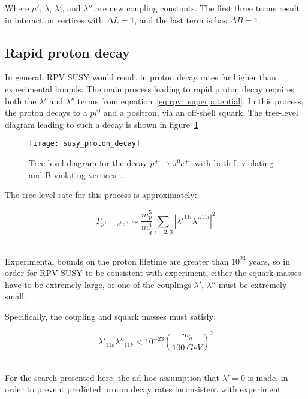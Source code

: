 Where $\mu'$, $\lambda$, $\lambda'$, and $\lambda''$ are new coupling constants.
The first three terms result in interaction vertices with $\Delta L = 1$,
and the last term is has $\Delta B = 1$.

\subsection{Rapid proton decay}\label{subsec:proton_decay}

In general, RPV SUSY would result in proton decay rates far higher than experimental bounds.
The main process leading to rapid proton decay requires both the $\lambda'$ and $\lambda''$ terms from equation~\ref{eq:rpv_superpotential}.
In this process, the proton decays to a $pi^0$ and a positron, via an off-shell squark.
The tree-level diagram leading to such a decay is shown in figure~\ref{fig:susy_proton_decay}

\begin{figure}[!ht]
    \centering
\texttt{[image: susy\_proton\_decay]}
\caption{Tree-level diagram for the decay $p^+ \rightarrow \pi^0 e^+$, with both L-violating and B-violating vertices~\cite{susy-primer-1998}.}
\label{fig:susy_proton_decay}
\end{figure}

The tree-level rate for this process is approximately:

\begin{equation}\label{eq:proton_decay_rate}
    \Gamma_{p^+ \rightarrow \pi^0 e^+} \sim \frac{m_p^5}{m_{\tilde{d}}^4} \sum_{i=2,3}\left|\lambda'^{11i}\lambda''^{11i}\right|^2
\end{equation}~\cite{susy-primer-1998}

Experimental bounds on the proton lifetime are greater than $10^{23}$ years,
so in order for RPV SUSY to be consistent with experiment,
either the squark masses have to be extremely large, or one of the couplings $\lambda'$, $\lambda''$ must be extremely small.

Specifically, the coupling and squark masses must satisfy:

\begin{equation}\label{eq:rpv_constraint}
    \lambda'_{11k} \lambda''_{11k} < 10^{-23} \left(\frac{m_{\tilde{q}}}{100~GeV}\right)^2
\end{equation}~\cite{susy-rpv-constraints}

For the search presented here, the ad-hoc assumption that $\lambda' = 0$ is made, in order to prevent predicted proton
decay rates inconsistent with experiment.

